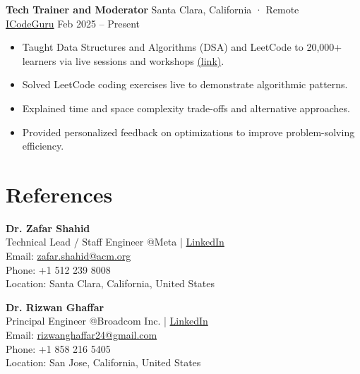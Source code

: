 \documentclass[a4paper,12pt]{article}
\begin{document}
\vspace{0.5em}

\textbf{Tech Trainer and Moderator} \hfill Santa Clara, California · Remote \\
\href{https://icode.guru/}{ICodeGuru} \hfill Feb 2025 -- Present
\begin{itemize}[leftmargin=*]
    \item Taught Data Structures and Algorithms (DSA) and LeetCode to 20,000+ learners via live sessions and workshops \href{https://github.com/Qasim-Gill/Volunteer-Teaching-and-Mentorship}{(link)}.
    \item Solved LeetCode coding exercises live to demonstrate algorithmic patterns.
    \item Explained time and space complexity trade-offs and alternative approaches.
    \item Provided personalized feedback on optimizations to improve problem-solving efficiency.
\end{itemize}


\section{References}

\textbf{Dr. Zafar Shahid} \\
Technical Lead / Staff Engineer @Meta | \href{https://www.linkedin.com/in/zafarshahid/}{LinkedIn} \\
Email: \href{mailto:zafar.shahid@acm.org}{zafar.shahid@acm.org} \\
Phone: +1 512 239 8008 \\
Location: Santa Clara, California, United States

\vspace{1em}

\textbf{Dr. Rizwan Ghaffar} \\
Principal Engineer @Broadcom Inc. | \href{https://www.linkedin.com/in/rizwan-ghaffar/}{LinkedIn} \\
Email: \href{mailto:rizwanghaffar24@gmail.com}{rizwanghaffar24@gmail.com} \\
Phone: +1 858 216 5405 \\
Location: San Jose, California, United States


\vfill
\end{document}
